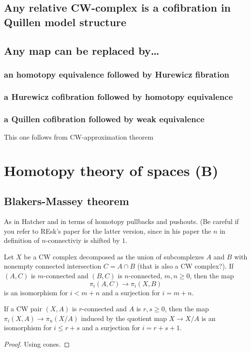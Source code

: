 \begin{remark}
\subsection{Any relative CW-complex is a cofibration in Quillen model structure}
\subsection{Any map can be replaced by…} 
\subsubsection{an homotopy equivalence followed by Hurewicz fibration}
\subsubsection{a Hurewicz cofibration followed by homotopy equivalence}
\subsubsection{a Quillen cofibration followed by weak equivalence}
This one follows from CW-approximation theorem

\section{Homotopy theory  of spaces (B)}

\subsection{Blakers-Massey theorem}

As in Hatcher and in terms of homotopy pullbacks and pushouts. (Be careful if you refer to REsk's paper for the latter version, since in his paper the $n$ in definition of $n$-connectiviy is shifted by $1$.
\begin{thm}
	Let $X$ be a CW complex decomposed as the union of subcomplexes $A$ and $B$ with nonempty connected intersection $C=A\cap B$ {\color{magenta}(that is also a CW complex?)}. If $(A,C)$ is $m$-connected and $(B,C)$ is $n$-connected, $m,n\geq 0$, then the map
	\[\pi_{i}(A,C)\to \pi_{i}(X,B)\]
is an isomorphism for $i<m+n$ and a surjection for $i=m+n$.
\end{thm}

\begin{prop}
	If a CW pair $(X,A)$ is $r$-connected and $A$ is $r,s \geq 0$, then the map $\pi_{i}(X,A)\to \pi_{n}(X/A)$ induced by the quotient map $X\to X/A$ is an isomorphism for $i\leq r+s$ and a surjection for $i=r+s+1$.
\end{prop}
\begin{proof}
	Using cones.
\end{proof}


\end{remark}
